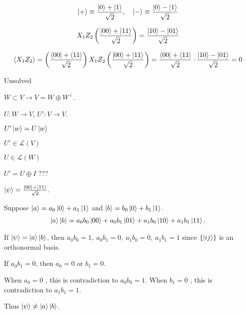 \begin{align*}
    \ket{+} \equiv \frac{\ket{0} + \ket{1}}{\sqrt{2}}, ~~~ \ket{-} \equiv \frac{\ket{0} - \ket{1}}{\sqrt{2}}
\end{align*}


\begin{align*}
     X_1 Z_2 \left(\frac{\ket{00} + \ket{11}}{\sqrt{2}} \right) = \frac{\ket{10} - \ket{01}}{\sqrt{2}}
\end{align*}


\begin{align*}
     \braket{X_1 Z_2} = \left(\frac{\bra{00} + \bra{11}}{\sqrt{2}} \right) X_1 Z_2 \left(\frac{\ket{00} + \ket{11}}{\sqrt{2}} \right) 
    = \frac{\bra{00} + \bra{11}}{\sqrt{2}}  \cdot \frac{\ket{10} - \ket{01}}{\sqrt{2}} 
    = 0
\end{align*}




Unsolved

$W \subset V \rightarrow V = W \oplus W^\perp$.

$U: W \rightarrow V$, $U': V \rightarrow V$.

$U' \ket{w} = U\ket{w}$

$U' \in \mathcal{L}(V)$

$U \in \mathcal{L}(W)$

$U' = U \oplus I$ ???



$\ket{\psi} = \frac{\ket{00} + \ket{11}}{\sqrt{2}}$.

Suppose $\ket{a} = a_0 \ket{0}  + a_1\ket{1}$ and $\ket{b} = b_0 \ket{0}  + b_1\ket{1}$.
%
\begin{align*}
    \ket{a} \ket{b} = a_0 b_0 \ket{00} + a_0 b_1 \ket{01} + a_1 b_0 \ket{10} + a_1 b_1 \ket{11}.
\end{align*}

If $\ket{\psi} = \ket{a} \ket{b}$, then $a_0 b_0 = 1,~ a_0 b_1=0,~ a_1 b_0 = 0,~ a_1 b_1 = 1$ since $\{\ket{ij}\}$ is an orthonormal basis. 

If $a_0 b_1 = 0$, then $a_0 = 0$ or $b_1 = 0$.

When $a_0 = 0$ , this is contradiction to $a_0 b_0 = 1$.
When $b_1 = 0$ , this is contradiction to $a_1 b_1 = 1$.

Thus $\ket{\psi} \neq \ket{a} \ket{b}$.



